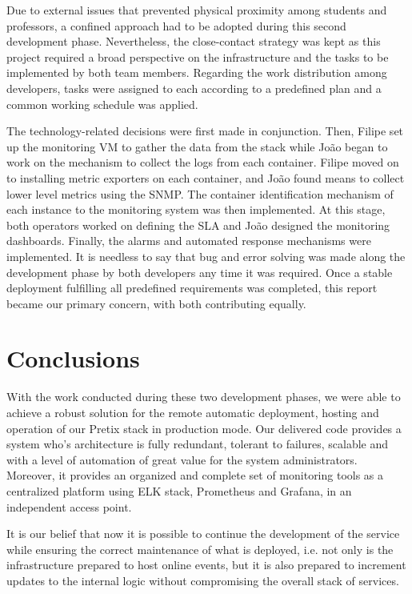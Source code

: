 \documentclass[12pt]{article}
\begin{document}

Due to external issues that prevented physical proximity among students and professors, a confined approach had to be adopted during this second development phase.
Nevertheless, the close-contact strategy was kept as this project required a broad perspective on the infrastructure and the tasks to be implemented by both team members.
Regarding the work distribution among developers, tasks were assigned to each according to a predefined plan and a common working schedule was applied.

The technology-related decisions were first made in conjunction.
Then, Filipe set up the monitoring VM to gather the data from the stack while João began to work on the mechanism to collect the logs from each container.
Filipe moved on to installing metric exporters on each container, and João found means to collect lower level metrics using the SNMP.
The container identification mechanism of each instance to the monitoring system was then implemented.
At this stage, both operators worked on defining the SLA and João designed the monitoring dashboards.
Finally, the alarms and automated response mechanisms were implemented.
It is needless to say that bug and error solving was made along the development phase by both developers any time it was required.
Once a stable deployment fulfilling all predefined requirements was completed, this report became our primary concern, with both contributing equally.

\section*{Conclusions} \label{conclusions} %

With the work conducted during these two development phases, we were able to achieve a robust solution for the remote automatic deployment, hosting and operation 
of our Pretix stack in production mode.
Our delivered code provides a system who's architecture is fully redundant, tolerant to failures, scalable and with a level of automation of great value for the 
system administrators.
Moreover, it provides an organized and complete set of monitoring tools as a centralized platform using ELK stack, Prometheus and Grafana, in an independent 
access point.

It is our belief that now it is possible to continue the development of the service while ensuring the correct maintenance of what is deployed, i.e. not only 
is the infrastructure prepared to host online events, but it is also prepared to increment updates to the internal logic without compromising the overall stack 
of services.
\end{document}
